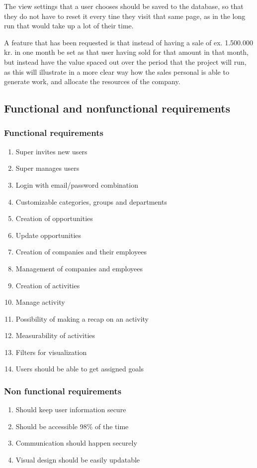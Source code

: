 The view settings that a user chooses should be saved to the database, so that they do not have to reset it every tine they visit that same page, as in the long run that would take up a lot of their time.

A feature that has been requested is that instead of having a sale of ex. 1.500.000 kr. in one month be set as that user having sold for that amount in that month, but instead have the value spaced out over the period that the project will run, as this will illustrate in a more clear way how the sales personal is able to generate work, and allocate the resources of the company.

\subsection{Functional and nonfunctional requirements}
\label{sub:Functional and nonfunctional requirements}

\subsubsection{Functional requirements}
\label{subs:Functional requirements}
\begin{enumerate}[label=\textbf{F\arabic*}]
  \item Super invites new users
  \item Super manages users
  \item Login with email/password combination
  \item Customizable categories, groups and departments
  \item Creation of opportunities
  \item Update opportunities
  \item Creation of companies and their employees
  \item Management of companies and employees
  \item Creation of activities
  \item Manage activity
  \item Possibility of making a recap on an activity
  \item Measurability of activities
  \item Filters for visualization
  \item Users should be able to get assigned goals
\end{enumerate}

\subsubsection{Non functional requirements}
\label{subs:Non functional requirements}
\begin{enumerate}[label=\textbf{NF\arabic*}]
  \item Should keep user information secure
  \item Should be accessible 98\% of the time
  \item Communication should happen securely
  \item Visual design should be easily updatable
\end{enumerate}


